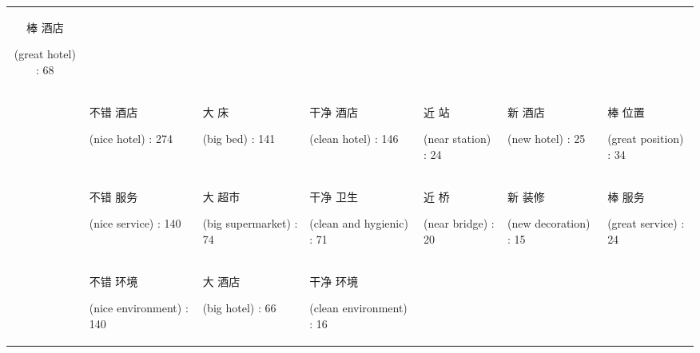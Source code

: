 \documentclass[smallextended,natbib]{svjour3}       %
\begin{document}
\begin{landscape}
\begin{table}[p]
{\begin{tabular}{|c|l|l|l|l|l|l|}
          \begin{CJK}{UTF8}{gbsn}棒 酒店\end{CJK} (great hotel) : 68 \\
         &
          \begin{CJK}{UTF8}{gbsn}不错 酒店\end{CJK} (nice hotel) : 274 &
          \begin{CJK}{UTF8}{gbsn}大 床\end{CJK} (big bed) : 141 &
          \begin{CJK}{UTF8}{gbsn}干净 酒店\end{CJK} (clean hotel) : 146 &
          \begin{CJK}{UTF8}{gbsn}近 站\end{CJK} (near station) : 24 &
          \begin{CJK}{UTF8}{gbsn}新 酒店\end{CJK} (new hotel) : 25 &
          \begin{CJK}{UTF8}{gbsn}棒 位置\end{CJK} (great position) : 34 \\
         &
          \begin{CJK}{UTF8}{gbsn}不错 服务\end{CJK} (nice service) : 140 &
          \begin{CJK}{UTF8}{gbsn}大 超市\end{CJK} (big supermarket) : 74 &
          \begin{CJK}{UTF8}{gbsn}干净 卫生\end{CJK} (clean and hygienic) : 71 &
          \begin{CJK}{UTF8}{gbsn}近 桥\end{CJK} (near bridge) : 20 &
          \begin{CJK}{UTF8}{gbsn}新 装修\end{CJK} (new decoration) : 15 &
          \begin{CJK}{UTF8}{gbsn}棒 服务\end{CJK} (great service) : 24 \\
         &
          \begin{CJK}{UTF8}{gbsn}不错 环境\end{CJK} (nice environment) : 140 &
          \begin{CJK}{UTF8}{gbsn}大 酒店\end{CJK} (big hotel) : 66 &
          \begin{CJK}{UTF8}{gbsn}干净 环境\end{CJK} (clean environment) : 16 &

\end{tabular}}
\end{table}
\end{landscape}
\end{document}
